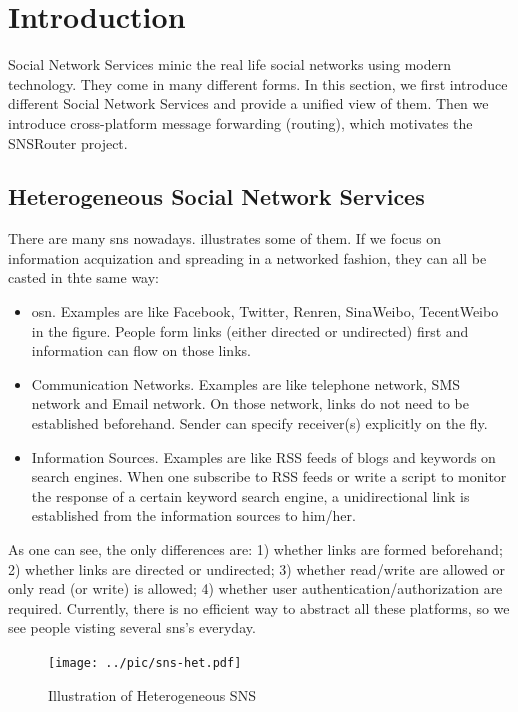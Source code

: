 \documentclass{sig-alternate}
\begin{document}
\section{Introduction}
\label{sec:Introduction}

Social Network Services minic the real life social networks using modern technology. 
They come in many different forms. 
In this section, we first introduce different Social Network Services
and provide a unified view of them. 
Then we introduce cross-platform message forwarding (routing), 
which motivates the SNSRouter project. 

\subsection{Heterogeneous Social Network Services}
\label{sec:Heterogeneous Social Network Services}

There are many \gls{sns} nowadays.
\rfig{\ref{fig:sns-het}} 
illustrates some of them. 
If we focus on information acquization and spreading
in a networked fashion, 
they can all be casted in thte same way:
\begin{itemize}
	\item \gls{osn}. Examples are like Facebook, Twitter, 
		Renren, SinaWeibo, TecentWeibo in the figure. 
		People form links (either directed or undirected) first
		and information can flow on those links. 
	\item Communication Networks.  
		Examples are like telephone network, SMS network and Email network. 
		On those network, links do not need to be established beforehand. 
		Sender can specify receiver(s) explicitly on the fly. 
	\item Information Sources. 
		Examples are like RSS feeds of blogs and keywords on search engines. 
		When one subscribe to RSS feeds or write a script to monitor the 
		response of a certain keyword search engine, 
		a unidirectional link is established from the information sources to him/her. 
\end{itemize}

As one can see, the only differences are:
1) whether links are formed beforehand;
2) whether links are directed or undirected;
3) whether read/write are allowed or only read (or write) is allowed;
4) whether user authentication/authorization are required.
Currently, there is no efficient way to abstract all these platforms, 
so we see people visting several \gls{sns}'s everyday. 

\begin{figure}[t!]
	\centering
	\texttt{[image: ../pic/sns-het.pdf]}
	\caption{Illustration of Heterogeneous SNS}
	\label{fig:sns-het}
\end{figure}
\end{document}
